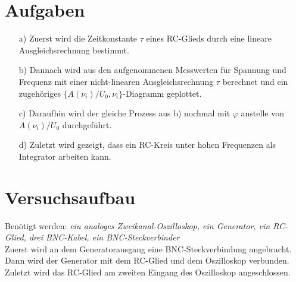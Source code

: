 \section{Aufgaben}
 \begin{enumerate}
    \item[a)] Zuerst wird die Zeitkonstante $\tau$ eines RC-Glieds durch 
              eine lineare Ausgleichsrechnung bestimmt.

    \item[b)] Dannach wird aus den aufgenommenen Messwerten für Spannung und 
              Frequenz mit einer nicht-linearen Ausgleichsrechnung $\tau$ berechnet 
              und ein zugehöriges $\{ A(\nu _i)/U_0,\nu _i \}$-Diagramm geplottet.
  
    \item[c)] Daraufhin wird der gleiche Prozess aus b) nochmal mit
              $\varphi$ anstelle von $A(\nu _i)/U_0$ durchgeführt.
  
    \item[d)] Zuletzt wird gezeigt, dass ein RC-Kreis unter hohen Frequenzen 
              als Integrator arbeiten kann.
  \end{enumerate}

  



\section{Versuchsaufbau}
Benötigt werden: \textit{ein analoges Zweikanal-Oszilloskop, ein Generator, ein RC-Glied, drei BNC-Kabel, ein BNC-Steckverbinder }\\
Zuerst wird an dem Generatorausgang eine BNC-Steckverbindung angebracht. 
Dann wird der Generator mit dem RC-Glied und dem Oszilloskop verbunden. \\
Zuletzt wird das RC-Glied am zweiten Eingang des Oszilloskop angeschlossen.

